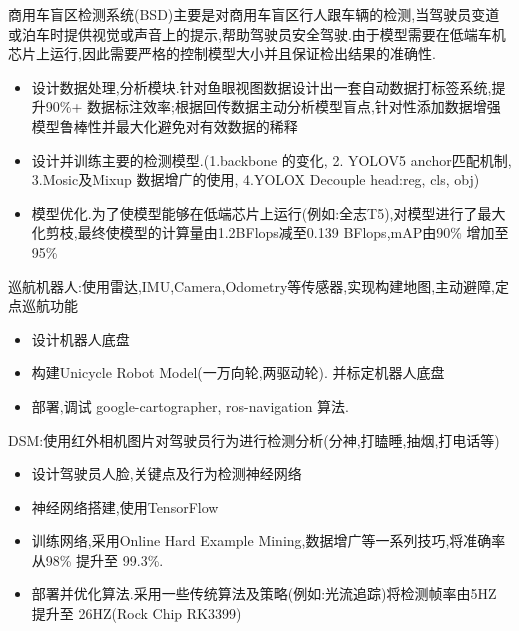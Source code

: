 \documentclass{resume}
\begin{document}
\begin{onehalfspacing}
商用车盲区检测系统(BSD)主要是对商用车盲区行人跟车辆的检测,当驾驶员变道或泊车时提供视觉或声音上的提示,帮助驾驶员安全驾驶.由于模型需要在低端车机芯片上运行,因此需要严格的控制模型大小并且保证检出结果的准确性.

\begin{itemize}
  \item 设计数据处理,分析模块.针对鱼眼视图数据设计出一套自动数据打标签系统,提升90\%+ 数据标注效率;根据回传数据主动分析模型盲点,针对性添加数据增强模型鲁棒性并最大化避免对有效数据的稀释
  \item 设计并训练主要的检测模型.(1.backbone 的变化, 2. YOLOV5 anchor匹配机制, 3.Mosic及Mixup 数据增广的使用, 4.YOLOX Decouple head:reg, cls, obj)
  \item 模型优化.为了使模型能够在低端芯片上运行(例如:全志T5),对模型进行了最大化剪枝,最终使模型的计算量由1.2BFlops减至0.139 BFlops,mAP由90\% 增加至 95\%
\end{itemize}
\end{onehalfspacing}


\begin{onehalfspacing}
巡航机器人:使用雷达,IMU,Camera,Odometry等传感器,实现构建地图,主动避障,定点巡航功能
\begin{itemize}
  \item 设计机器人底盘
  \item 构建Unicycle Robot Model(一万向轮,两驱动轮). 并标定机器人底盘
  \item 部署,调试 google-cartographer, ros-navigation 算法.
\end{itemize}
\end{onehalfspacing}


\begin{onehalfspacing}
DSM:使用红外相机图片对驾驶员行为进行检测分析(分神,打瞌睡,抽烟,打电话等)
\begin{itemize}
  \item 设计驾驶员人脸,关键点及行为检测神经网络
  \item 神经网络搭建,使用TensorFlow
  \item 训练网络,采用Online Hard Example Mining,数据增广等一系列技巧,将准确率从98\% 提升至 99.3\%.
  \item 部署并优化算法.采用一些传统算法及策略(例如:光流追踪)将检测帧率由5HZ 提升至 26HZ(Rock Chip RK3399)
\end{itemize}
\end{onehalfspacing}
\end{document}
